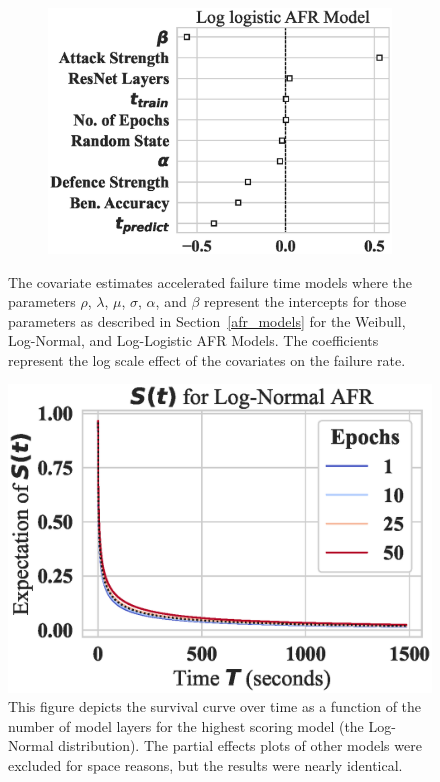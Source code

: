 \begin{figure}
\begin{subfigure}[t]{0.3\textwidth}
        \includegraphics[width=\textwidth]{mnist_log_logistic_aft.eps}
    \end{subfigure}

    \caption{The covariate estimates accelerated failure time models where the parameters $\rho$, $\lambda$, $\mu$, $\sigma$, $\alpha$, and $\beta$ represent the intercepts for those parameters as described in Section~\ref{afr_models} for the Weibull, Log-Normal, and Log-Logistic AFR Models. The coefficients represent the log scale effect of the covariates on the failure rate.}
    \label{fig:mnist_afr_models}
\end{figure}

\begin{figure}
    \centering\includegraphics[width=.5\textwidth]{mnist_log_normal_epochs_partial_effect.eps}
    \caption{This figure depicts the survival curve over time as a function of the number of model layers for the highest scoring model (the Log-Normal distribution). The partial effects plots of other models were excluded for space reasons, but the results were nearly identical.}
    \label{fig:mnist_layers}
\end{figure}

